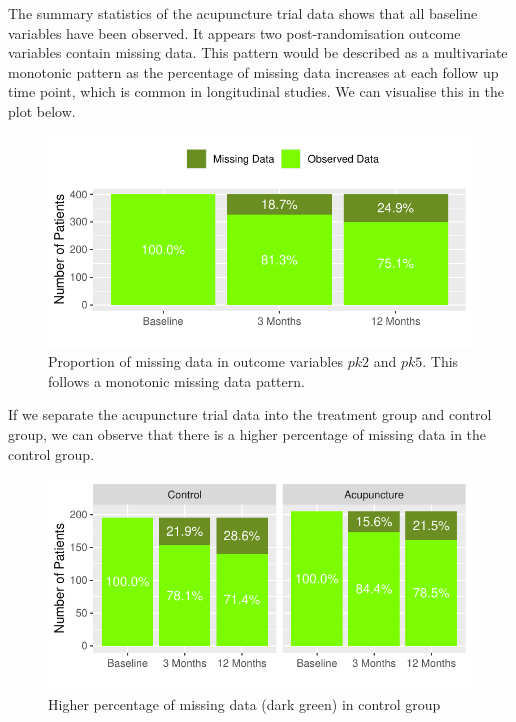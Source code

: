 \documentclass{article}
\newcommand{\pandocbounded}[1]{#1}
\begin{document}
The summary statistics of the acupuncture trial data shows that all
baseline variables have been observed. It appears two post-randomisation
outcome variables contain missing data. This pattern would be described
as a multivariate monotonic pattern as the percentage of missing data
increases at each follow up time point, which is common in longitudinal
studies. We can visualise this in the plot below.

\begin{figure}
\centering
\pandocbounded{\includegraphics[keepaspectratio]{Final_Report_files/figure-latex/unnamed-chunk-18-1.pdf}}
\caption{Proportion of missing data in outcome variables \(pk2\) and
\(pk5\). This follows a monotonic missing data pattern.}
\end{figure}

If we separate the acupuncture trial data into the treatment group and
control group, we can observe that there is a higher percentage of
missing data in the control group.

\begin{figure}
\centering
\pandocbounded{\includegraphics[keepaspectratio]{Final_Report_files/figure-latex/unnamed-chunk-19-1.pdf}}
\caption{Higher percentage of missing data (dark green) in control
group}
\end{figure}
\end{document}
